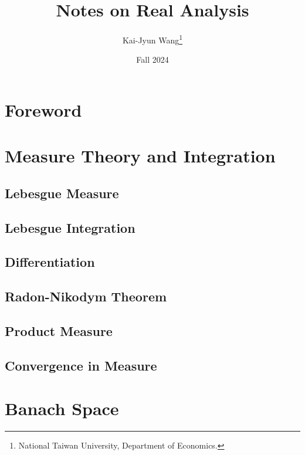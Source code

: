 \documentclass[a4paper, 12pt]{article}
\title{Notes on Real Analysis}
\author{Kai-Jyun Wang\thanks{National Taiwan University, Department of Economics.}}
\date{Fall 2024}
\begin{document}
 
\maketitle

\section*{Foreword}


\newpage
\tableofcontents
\newpage

\section{Measure Theory and Integration}

\subsection{Lebesgue Measure}


\subsection{Lebesgue Integration}


\subsection{Differentiation}


\subsection{Radon-Nikodym Theorem}


\subsection{Product Measure}


\subsection{Convergence in Measure}


\newpage

\section{Banach Space}
\end{document}
